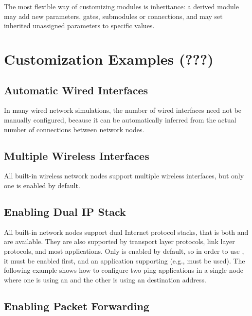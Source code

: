 The most flexible way of customizing modules is inheritance: a derived
module may add new parameters, gates, submodules or connections, and may
set inherited unassigned parameters to specific values.

\section{Customization Examples (???)}

\subsection{Automatic Wired Interfaces}

In many wired network simulations, the number of wired interfaces need not
be manually configured, because it can be automatically inferred from the
actual number of connections between network nodes.


\subsection{Multiple Wireless Interfaces}

All built-in wireless network nodes support multiple wireless interfaces,
but only one is enabled by default.


\subsection{Enabling Dual IP Stack}

All built-in network nodes support dual Internet protocol stacks, that is
both  and  are available. They are also
supported by transport layer protocols, link layer protocols, and most
applications. Only  is enabled by default, so in order to
use , it must be enabled first, and an application
supporting  (e.g.,  must be used). The
following example shows how to configure two ping applications in a single
node where one is using an  and the other is using an
 destination address.


\subsection{Enabling Packet Forwarding}

